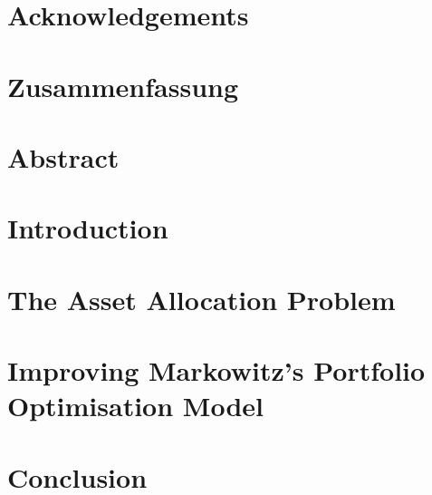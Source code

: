 \documentclass[a4paper,11pt,abstracton,oneside,titlepage,openany,nochapterprefix,noappendixprefix,liststotoc,bibtotoc,normalheadings,pointlessnumbers,BCOR1cm]{article}
\begin{document}
\mbox{}
\newpage

\topmargin -2.0cm
\textheight 24cm
\textwidth 13cm

\mbox{}
\newpage

\mbox{}
\section*{Acknowledgements}

\newpage

\mbox{}
\newpage

\mbox{}
\section*{Zusammenfassung}

\newpage

\mbox{}
\newpage

\mbox{}
\section*{Abstract}

\newpage

\mbox{}
\newpage

\setcounter{page}{1}
\tableofcontents

\newpage

\pagestyle{plain}
\section{Introduction}\label{section:Introduction}

\newpage

\section{The Asset Allocation Problem}\label{section:TheAssetAllocationProblem}

\newpage

\section{Improving Markowitz's Portfolio Optimisation Model}\label{section:ImprovingMarkowitzsPortfolioOptimisationModel}

\newpage

\section{Conclusion}\label{section:Conclusion}

\newpage
\end{document}
